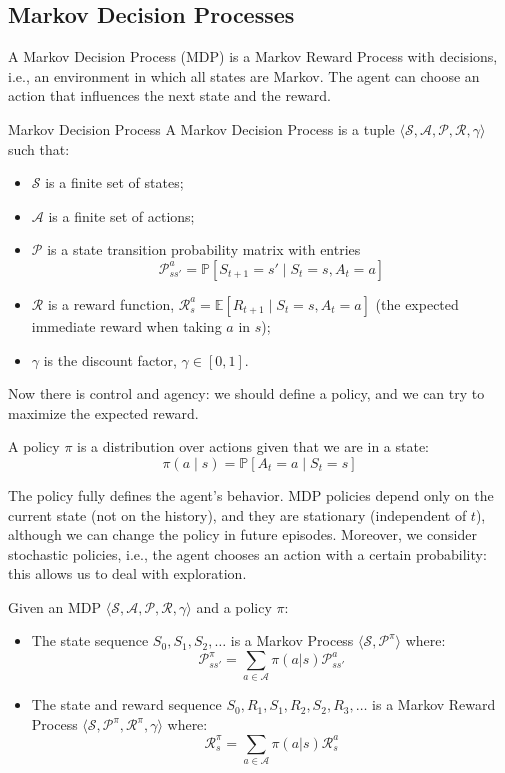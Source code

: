 \subsection{Markov Decision Processes}
A Markov Decision Process (MDP) is a Markov Reward Process with decisions, i.e., an environment in which all states are Markov. The agent can choose an action that influences the next state and the reward.
\begin{defbox}{Markov Decision Process}
    A Markov Decision Process is a tuple $\langle \mathcal{S}, \mathcal{A}, \mathcal{P}, \mathcal{R}, \gamma \rangle$ such that:
    \begin{itemize}
        \item $\mathcal{S}$ is a finite set of states;
        \item $\mathcal{A}$ is a finite set of actions;
        \item $\mathcal{P}$ is a state transition probability matrix with entries \[\mathcal{P}_{ss'}^a = \mathbb{P}[S_{t+1}=s'\mid S_t=s, A_t=a]\]
        \item $\mathcal{R}$ is a reward function, $\mathcal{R}_s^a=\mathbb{E}[R_{t+1}\mid S_t=s, A_t=a]$ (the expected immediate reward when taking $a$ in $s$);
        \item $\gamma$ is the discount factor, $\gamma\in[0, 1]$.
    \end{itemize}
\end{defbox}
Now there is control and agency: we should define a policy, and we can try to maximize the expected reward.
\begin{definition}[Policy]
    A policy $\pi$ is a distribution over actions given that we are in a state:
    \[\pi(a\mid s)=\mathbb{P}[A_t=a\mid S_t=s]\]
\end{definition}
The policy fully defines the agent's behavior. MDP policies depend only on the current state (not on the history), and they are stationary (independent of $t$), although we can change the policy in future episodes. Moreover, we consider stochastic policies, i.e., the agent chooses an action with a certain probability: this allows us to deal with exploration.

Given an MDP $\langle \mathcal{S}, \mathcal{A}, \mathcal{P}, \mathcal{R}, \gamma \rangle$ and a policy $\pi$:
\begin{itemize}
    \item The state sequence $S_0, S_1, S_2, \ldots$ is a Markov Process $\langle\mathcal{S},\mathcal{P}^\pi\rangle$ where: \[\mathcal{P}_{ss'}^\pi=\sum_{a\in\mathcal{A}}\pi(a|s)\mathcal{P}_{ss'}^a\]
    \item The state and reward sequence $S_0, R_1, S_1, R_2, S_2, R_3, \ldots$ is a Markov Reward Process $\langle\mathcal{S},\mathcal{P}^\pi,\mathcal{R}^\pi,\gamma\rangle$ where: \[\mathcal{R}_s^\pi=\sum_{a\in\mathcal{A}}\pi(a|s)\mathcal{R}_s^a\] 
\end{itemize}

